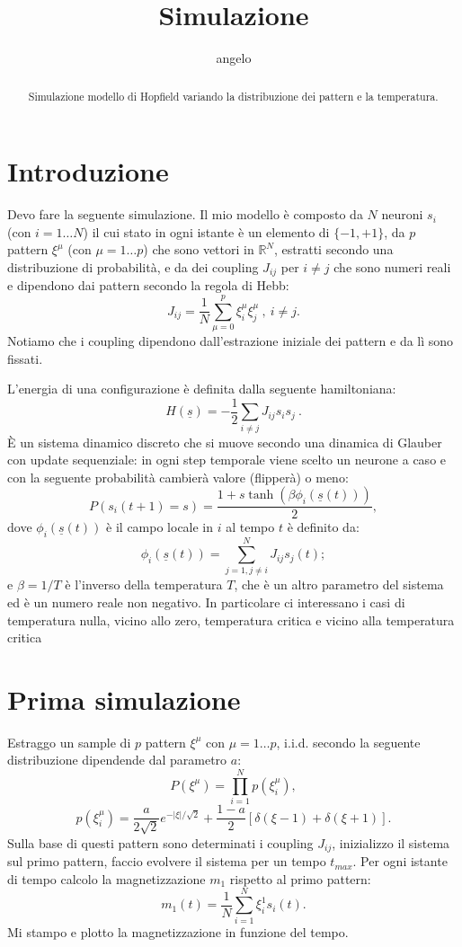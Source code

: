 \documentclass[a4paper,10pt]{article}
\title{Simulazione}
\author{angelo}
\begin{document}
\maketitle

\begin{abstract}
Simulazione modello di Hopfield variando la distribuzione dei pattern e la temperatura.
\end{abstract}

\section*{Introduzione}

Devo fare la seguente simulazione. Il mio modello è composto da $N$ neuroni $s_i$ (con $i=1\ldots N$) il cui stato in ogni istante è un elemento di $\{-1,+1 \}$, da $p$ pattern $\xi^\mu$ (con $\mu=1\ldots p$) che sono vettori in $\mathbb{R}^N$, estratti secondo una distribuzione di probabilità, e da dei coupling $J_{ij}$ per $i\neq j$ che sono numeri reali e dipendono dai pattern secondo la regola di Hebb:
\begin{equation}
 J_{ij}=\frac{1}{N}\sum_{\mu = 0}^p \xi_i^\mu \xi_j^\mu \ ,\ i\neq j .
 \label{eq:hebb}
\end{equation}
Notiamo che i coupling dipendono dall'estrazione iniziale dei pattern e da lì sono fissati.

L'energia di una configurazione è definita dalla seguente hamiltoniana:
\[
 H(\underline{s}) = -\frac{1}{2} \sum_{i\neq j} J_{ij} s_i s_j\ .
\]
\`{E} un sistema dinamico discreto che si muove secondo una dinamica di Glauber \cite{10.1063/1.1703954} con update sequenziale: in ogni step temporale viene scelto un neurone a caso e con la seguente probabilità cambierà valore (flipperà) o meno:
\[
 P(s_i(t+1)=s) = \frac{1 + s \tanh (\beta \phi_i(\underline{s}(t)))}{2} ,
\]
dove $\phi_i(\underline{s}(t))$ è il campo locale in $i$ al tempo $t$ è definito da:
\[
 \phi_i(\underline{s}(t)) = \sum_{j=1,j\neq i}^N J_{ij}s_j(t) ;
\]
e  $\beta = 1/T$ è l'inverso della temperatura $T$, che è un altro parametro del sistema ed è un numero reale non negativo. In particolare ci interessano i casi di temperatura nulla, vicino allo zero, temperatura critica e vicino alla temperatura critica

\section{Prima simulazione}

Estraggo un sample di $p$ pattern $\xi^\mu$ con $\mu=1\ldots p$, i.i.d. secondo la seguente distribuzione dipendende dal parametro $a$:
\[
 P(\xi^\mu)=\prod_{i=1}^N p(\xi_i^\mu),
\]
\[
 p(\xi_i^\mu) = \frac{a}{2\sqrt{2}} e^{-|\xi|/\sqrt{2}} + \frac{1-a}{2} \left[ \delta(\xi-1) + \delta(\xi+1) \right].
\]
Sulla base di questi pattern sono determinati i coupling $J_{ij}$, inizializzo il sistema sul primo pattern, faccio evolvere il sistema per un tempo $t_{max}$. Per ogni istante di tempo calcolo la magnetizzazione $m_1$ rispetto al primo pattern:
\[
 m_1(t)=\frac{1}{N}\sum_{i=1}^N \xi_i^1 s_i(t) .
\]
Mi stampo e plotto la magnetizzazione in funzione del tempo.
\end{document}

